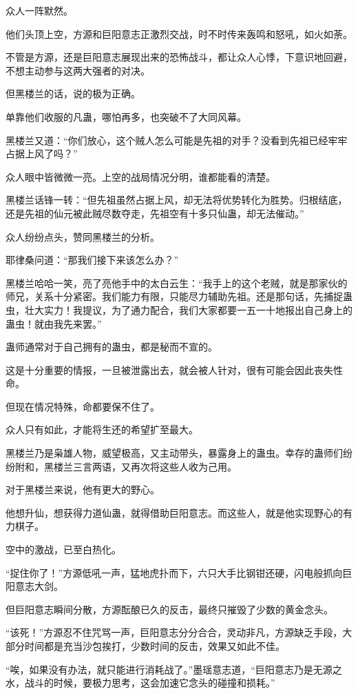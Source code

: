 \begin{this_body}
众人一阵默然。

他们头顶上空，方源和巨阳意志正激烈交战，时不时传来轰鸣和怒吼，如火如荼。

不管是方源，还是巨阳意志展现出来的恐怖战斗，都让众人心悸，下意识地回避，不想主动参与这两大强者的对决。

但黑楼兰的话，说的极为正确。

单靠他们收服的凡蛊，哪怕再多，也突破不了大同风幕。

黑楼兰又道：“你们放心，这个贼人怎么可能是先祖的对手？没看到先祖已经牢牢占据上风了吗？”

众人眼中皆微微一亮。上空的战局情况分明，谁都能看的清楚。

黑楼兰话锋一转：“但先祖虽然占据上风，却无法将优势转化为胜势。归根结底，还是先祖的仙元被此贼尽数夺走，先祖空有十多只仙蛊，却无法催动。”

众人纷纷点头，赞同黑楼兰的分析。

耶律桑问道：“那我们接下来该怎么办？”

黑楼兰哈哈一笑，亮了亮他手中的太白云生：“我手上的这个老贼，就是那家伙的师兄，关系十分紧密。我们能力有限，只能尽力辅助先祖。还是那句话，先捕捉蛊虫，壮大实力！我提议，为了通力配合，我们大家都要一五一十地报出自己身上的蛊虫！就由我先来罢。”

蛊师通常对于自己拥有的蛊虫，都是秘而不宣的。

这是十分重要的情报，一旦被泄露出去，就会被人针对，很有可能会因此丧失性命。

但现在情况特殊，命都要保不住了。

众人只有如此，才能将生还的希望扩至最大。

黑楼兰乃是枭雄人物，威望极高，又主动带头，暴露身上的蛊虫。幸存的蛊师们纷纷附和，黑楼兰三言两语，又再次将这些人收为己用。

对于黑楼兰来说，他有更大的野心。

他想升仙，想获得力道仙蛊，就得借助巨阳意志。而这些人，就是他实现野心的有力棋子。

空中的激战，已至白热化。

“捉住你了！”方源低吼一声，猛地虎扑而下，六只大手比钢钳还硬，闪电般抓向巨阳意志大剑。

但巨阳意志瞬间分散，方源酝酿已久的反击，最终只摧毁了少数的黄金念头。

“该死！”方源忍不住咒骂一声，巨阳意志分分合合，灵动非凡，方源缺乏手段，大部分时间都是充当沙包挨打，少数时间的反击，效果又如此不佳。

“唉，如果没有办法，就只能进行消耗战了。”墨瑶意志道，“巨阳意志乃是无源之水，战斗的时候，要极力思考，这会加速它念头的碰撞和损耗。”


\end{this_body}
